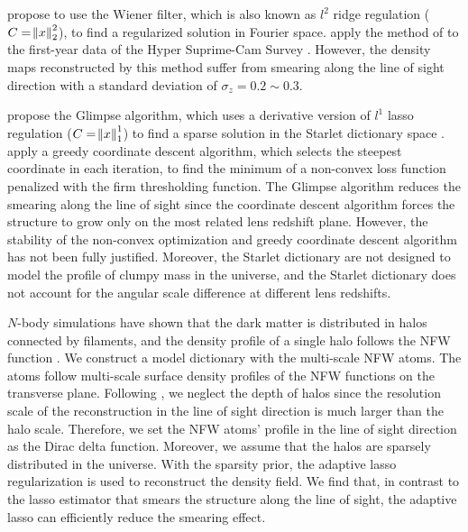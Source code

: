 \citet{LSS-massMap-Wiener-Simon2009} propose to use the Wiener filter, which is
also known as $l^2$ ridge regulation ($C=\norm{x}^2_2$), to find a regularized
solution in Fourier space. \citet{HSC1-massMaps} apply the method of
\citet{LSS-massMap-Wiener-Simon2009} to the first-year data of the Hyper
Suprime-Cam Survey \citep{HSC1-data}.  However, the density maps reconstructed
by this method suffer from smearing along the line of sight direction with a
standard deviation of $\sigma_z=0.2 \sim 0.3$.

\citet{LSS-massMap-Glimpse3D-Leonard2014} propose the Glimpse algorithm, which
uses a derivative version of $l^1$ lasso regulation ($C=\norm{x}^1_1$) to find
a sparse solution in the Starlet dictionary space \citep{Starlet-Starck2015}.
\citet{LSS-massMap-Glimpse3D-Leonard2014} apply a greedy coordinate descent
algorithm, which selects the steepest coordinate in each iteration, to find the
minimum of a non-convex loss function penalized with the firm thresholding
function. The Glimpse algorithm reduces the smearing along the line of sight
since the coordinate descent algorithm forces the structure to grow only on the
most related lens redshift plane.  However, the stability of the non-convex
optimization and greedy coordinate descent algorithm has not been fully
justified. Moreover, the Starlet dictionary are not designed to model the
profile of clumpy mass in the universe, and the Starlet dictionary does not
account for the angular scale difference at different lens redshifts.

$N$-body simulations have shown that the dark matter is distributed in halos
connected by filaments, and the density profile of a single halo follows the
NFW function \citep{halo-NFW1997ApJ}.  We construct a model dictionary with the
multi-scale NFW atoms.  The atoms follow multi-scale surface density profiles
of the NFW functions \citep{haloModel-TJ2003-3pt} on the transverse plane.
Following \citet{LSS-massMap-Glimpse3D-Leonard2014}, we neglect the depth of
halos since the resolution scale of the reconstruction in the line of sight
direction is much larger than the halo scale. Therefore, we set the NFW atoms'
profile in the line of sight direction as the Dirac delta function.  Moreover,
we assume that the halos are sparsely distributed in the universe.  With the
sparsity prior, the adaptive lasso regularization \citep{AdaLASSO-Zou2006} is
used to reconstruct the density field.  We find that, in contrast to the lasso
estimator that smears the structure along the line of sight, the adaptive lasso
can efficiently reduce the smearing effect.

